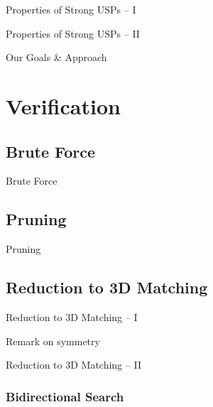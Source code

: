 \documentclass[t,10pt,
mathserif,xcolor=dvipsnames]{beamer}
\begin{document}
\begin{myframe}{Properties of Strong USPs -- I}

\end{myframe}

\begin{myframe}{Properties of Strong USPs -- II}

\end{myframe}

\begin{myframe}{Our Goals \& Approach}

\end{myframe}

\section{Verification}


\subsection{Brute Force}

\begin{myframe}{Brute Force}

\end{myframe}

\subsection{Pruning}

\begin{myframe}{Pruning}

\end{myframe}

\subsection{Reduction to 3D Matching}

\begin{myframe}{Reduction to 3D Matching -- I}

Remark on symmetry
  
\end{myframe}

\begin{myframe}{Reduction to 3D Matching -- II}

\end{myframe}

\subsubsection{Bidirectional Search}
\end{document}
